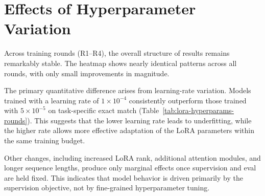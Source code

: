 
\section{Effects of Hyperparameter Variation}

Across training rounds (R1--R4), the overall structure of results remains remarkably stable.
The heatmap shows nearly identical patterns across all rounds, with only small improvements in magnitude.

The primary quantitative difference arises from learning-rate variation.
Models trained with a learning rate of $1 \times 10^{-4}$ consistently outperform those trained with $5 \times 10^{-5}$ on task-specific exact match (Table~\ref{tab:lora-hyperparams-rounds}).
This suggests that the lower learning rate leads to underfitting, while the higher rate allows more effective adaptation of the LoRA parameters within the same training budget.

Other changes, including increased LoRA rank, additional attention modules, and longer sequence lengths, produce only marginal effects once supervision and eval are held fixed.
This indicates that model behavior is driven primarily by the supervision objective, not by fine-grained hyperparameter tuning.

